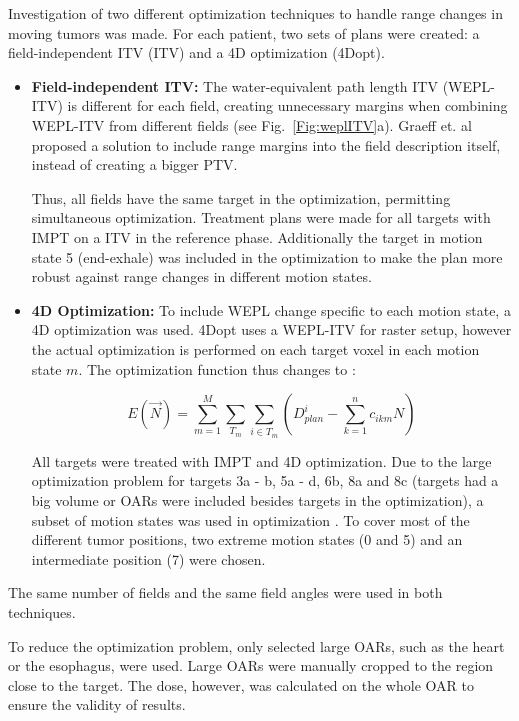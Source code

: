 Investigation of two different optimization techniques to handle range changes in moving tumors was made. For each patient, two sets of plans were created: a field-independent ITV (ITV) and a 4D optimization (4Dopt). 

\begin{itemize}
\item \textbf{Field-independent ITV:} The water-equivalent path length ITV (WEPL-ITV) is different for each field, creating unnecessary margins when combining 
WEPL-ITV from different fields (see Fig.~\ref{Fig:weplITV}a). 
Graeff et. al \cite{Graeff2012} proposed a solution to include range margins into the field description itself, instead of creating a bigger PTV. 

Thus, all fields have the same target in the optimization, permitting simultaneous optimization. 
Treatment plans were made for all targets with IMPT on a ITV in the reference phase. Additionally the target in motion state 5 (end-exhale) was included in the optimization
to make the plan more robust against range changes in different motion states.

\item \textbf{4D Optimization:} To include WEPL change specific to each motion state, a 4D optimization was used. 4Dopt uses a WEPL-ITV for raster setup, 
however the actual optimization is performed on each target voxel in each motion state $m$. The optimization function thus changes to \cite{Graeff2012}:

\begin{equation}
E(\vec{N}) = \sum_{m=1}^{M}\sum_{T_m} \sum_{i\in T_m} \left( D_{plan}^{i} -\sum_{k=1}^n c_{ikm}N\right)
\end{equation}

All targets were treated with IMPT and 4D optimization. Due to the large optimization problem for targets 3a - b, 5a - d, 6b, 8a and 8c (targets had a big volume or 
OARs were included besides targets in the optimization), a subset of motion states was used in optimization \cite{Graeff2012}. 
To cover most of the different tumor positions, two extreme motion states (0 and 5) and an intermediate position (7) were chosen.

\end{itemize}

The same number of fields and the same field angles were used in both techniques.

To reduce the optimization problem, only selected large OARs, such as the heart or the esophagus, were used. Large OARs were manually cropped to the region close to the 
target. The dose, however, was calculated on the whole OAR to ensure the validity of results.


